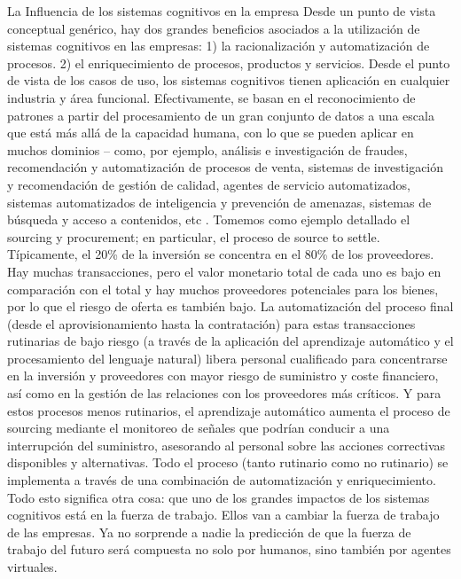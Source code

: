 La Influencia de los sistemas cognitivos en la empresa
Desde un punto de vista conceptual genérico, hay dos grandes beneficios asociados a la utilización de sistemas cognitivos en las empresas: 
1) la racionalización y automatización de procesos.
2) el enriquecimiento de procesos, productos y servicios.
Desde el punto de vista de los casos de uso, los sistemas cognitivos tienen aplicación en cualquier industria y área funcional. Efectivamente, se basan en el reconocimiento de patrones a partir del procesamiento de un gran conjunto de datos a una escala que está más allá de la capacidad humana, con lo que se pueden aplicar en muchos dominios – como, por ejemplo, análisis e investigación de fraudes, recomendación y automatización de procesos de venta, sistemas de investigación y recomendación de gestión de calidad, agentes de servicio automatizados, sistemas automatizados de inteligencia y prevención de amenazas, sistemas de búsqueda y acceso a contenidos, etc \cite{Malhado}.
Tomemos como ejemplo detallado el sourcing y procurement; en particular, el proceso de source to settle. Típicamente, el 20\% de la inversión se concentra en el 80\% de los proveedores. Hay muchas transacciones, pero el valor monetario total de cada uno es bajo en comparación con el total y hay muchos proveedores potenciales para los bienes, por lo que el riesgo de oferta es también bajo. La automatización del proceso final (desde el aprovisionamiento hasta la contratación) para estas transacciones rutinarias de bajo riesgo (a través de la aplicación del aprendizaje automático y el procesamiento del lenguaje natural) libera personal cualificado para concentrarse en la inversión y proveedores con mayor riesgo de suministro y coste financiero, así como en la gestión de las relaciones con los proveedores más críticos. Y para estos procesos menos rutinarios, el aprendizaje automático aumenta el proceso de sourcing mediante el monitoreo de señales que podrían conducir a una interrupción del suministro, asesorando al personal sobre las acciones correctivas disponibles y alternativas. Todo el proceso (tanto rutinario como no rutinario) se implementa a través de una combinación de automatización y enriquecimiento. Todo esto significa otra cosa: que uno de los grandes impactos de los sistemas cognitivos está en la fuerza de trabajo. Ellos van a cambiar la fuerza de trabajo de las empresas. Ya no sorprende a nadie la predicción de que la fuerza de trabajo del futuro será compuesta no solo por humanos, sino también por agentes virtuales.

